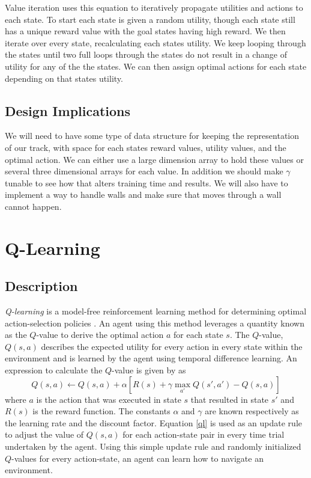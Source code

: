\documentclass{article}
\begin{document}
			Value iteration uses this equation to iteratively propagate utilities and actions to each state. To start each state is given a random utility, though each state still has a unique reward value with the goal states having high reward. We then iterate over every state, recalculating each states utility. We keep looping through the states until two full loops through the states do not result in a change of utility for any of the the states. We can then assign optimal actions for each state depending on that states utility.
		\subsection{Design Implications}
			We will need to have some type of data structure for keeping the representation of our track, with space for each states reward values, utility values, and the optimal action. We can either use a large dimension array to hold these values or several three dimensional arrays for each value. In addition we should make $\gamma$ tunable to see how that alters training time and results. We will also have to implement a way to handle walls and make sure that moves through a wall cannot happen.	
	\section{Q-Learning}
		\subsection{Description}
			\textit{Q-learning} is a model-free reinforcement learning method for determining optimal action-selection policies \cite{ai}. An agent using this method leverages a quantity known as the $Q$-value to derive the optimal action $a$ for each state $s$. The $Q$-value, $Q(s,a)$ describes the expected utility for every action in every state within the environment and is learned by the agent using temporal difference learning.
			An expression to calculate the $Q$-value is given by \cite{ai} as
			\begin{equation}
				Q(s,a) \leftarrow Q(s,a) + \alpha \left[ R(s) + \gamma \max_{a'} Q(s',a') - Q(s,a) \right]
				\label{ql}
			\end{equation}
			where $a$ is the action that was executed in state $s$ that resulted in state $s'$ and $R(s)$ is the reward function. The constants $\alpha$ and $\gamma$ are known respectively as the learning rate and the discount factor. Equation \ref{ql} is used as an update rule to adjust the value of $Q(s,a)$ for each action-state pair in every time trial undertaken by the agent. Using this simple update rule and randomly initialized $Q$-values for every action-state, an agent can learn how to navigate an environment.
\end{document}
